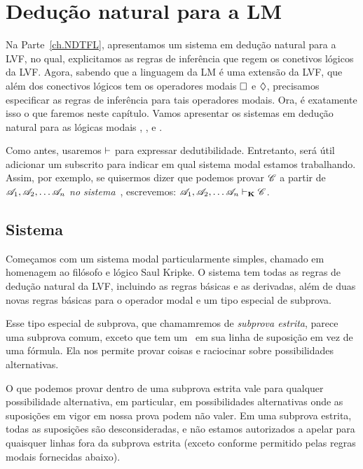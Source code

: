 \chapter{Dedução natural para a LM}
\label{Proof}

Na Parte~\ref{ch.NDTFL},  apresentamos um sistema em dedução natural para a LVF, no qual, explicitamos as regras de inferência que regem os conetivos lógicos da  LVF.  Agora, sabendo que a linguagem da LM é uma extensão da LVF,  que além dos conectivos lógicos tem os operadores modais   $\Box$ e $\Diamond$,  precisamos especificar as regras de inferência para tais operadores modais. Ora, é exatamente isso o que faremos neste capítulo. Vamos apresentar os sistemas em dedução  natural  para as lógicas modais  \mlK, \mlT, \mlSfour{} e \mlSfive.

Como  antes,  usaremos $\vdash$ para expressar dedutibilidade. Entretanto, será útil adicionar um subscrito para indicar em qual sistema modal estamos trabalhando. Assim,  por exemplo, se quisermos dizer que podemos provar $\mathscr{C}$ a partir de $\mathscr{A}_1,\mathscr{A}_2, \dots \mathscr{A}_n$ \emph{no sistema}~\mlK, escrevemos: $\mathscr{A}_1,\mathscr{A}_2, \dots \mathscr{A}_n \vdash_{\mathbf{K}} \mathscr{C}$.

\section{Sistema \mlK}
\label{K}

Começamos com um sistema modal particularmente simples, chamado \mlK{} em homenagem ao filósofo e lógico Saul Kripke. O sistema \mlK{} tem todas as regras de dedução natural da  LVF, incluindo as regras  básicas e as derivadas, além de  duas novas regras básicas para o operador modal   \ebox{}  e um tipo especial de subprova.   

Esse  tipo especial de subprova, que chamamremos de  \emph{subprova estrita}, parece uma subprova comum, exceto que tem um~\ebox{} em sua linha de suposição em vez de uma fórmula. Ela nos permite provar coisas e raciocinar sobre possibilidades alternativas. 
 
 O que podemos provar dentro de uma subprova estrita vale para qualquer possibilidade alternativa, em particular, em possibilidades alternativas onde as suposições em vigor em nossa prova podem não valer. Em uma subprova estrita, todas as suposições são desconsideradas, e não estamos autorizados a apelar para quaisquer linhas fora da subprova estrita (exceto conforme permitido pelas regras modais fornecidas abaixo).

